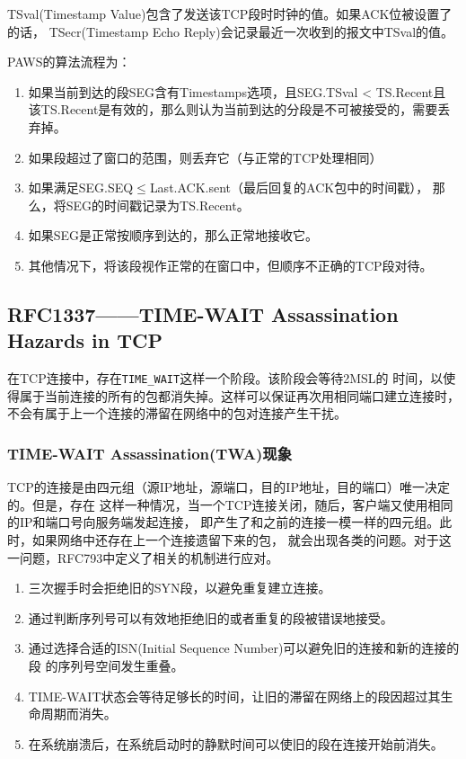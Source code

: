 			TSval(Timestamp Value)包含了发送该TCP段时时钟的值。如果ACK位被设置了的话，
			TSecr(Timestamp Echo Reply)会记录最近一次收到的报文中TSval的值。

PAWS的算法流程为：
\begin{enumerate}
  \item 如果当前到达的段SEG含有Timestamps选项，且SEG.TSval < TS.Recent且
该TS.Recent是有效的，那么则认为当前到达的分段是不可被接受的，需要丢弃掉。
  \item 如果段超过了窗口的范围，则丢弃它（与正常的TCP处理相同）
  \item 如果满足SEG.SEQ$\leqslant$Last.ACK.sent（最后回复的ACK包中的时间戳），
    那么，将SEG的时间戳记录为TS.Recent。
  \item 如果SEG是正常按顺序到达的，那么正常地接收它。
  \item 其他情况下，将该段视作正常的在窗口中，但顺序不正确的TCP段对待。
\end{enumerate}

\subsection{RFC1337——TIME-WAIT Assassination Hazards in TCP}
\label{subsec:rfc1337}
在TCP连接中，存在\texttt{TIME_WAIT}这样一个阶段。该阶段会等待2MSL的
时间，以使得属于当前连接的所有的包都消失掉。这样可以保证再次用相同端口建立连接时，
不会有属于上一个连接的滞留在网络中的包对连接产生干扰。

\subsubsection{TIME-WAIT Assassination(TWA)现象}
\label{subsec:time_wait_assassination}
TCP的连接是由四元组（源IP地址，源端口，目的IP地址，目的端口）唯一决定的。但是，存在
这样一种情况，当一个TCP连接关闭，随后，客户端又使用相同的IP和端口号向服务端发起连接，
即产生了和之前的连接一模一样的四元组。此时，如果网络中还存在上一个连接遗留下来的包，
就会出现各类的问题。对于这一问题，RFC793中定义了相关的机制进行应对。

\begin{enumerate}
\item 三次握手时会拒绝旧的SYN段，以避免重复建立连接。
\item 通过判断序列号可以有效地拒绝旧的或者重复的段被错误地接受。
\item 通过选择合适的ISN(Initial Sequence Number)可以避免旧的连接和新的连接的段
的序列号空间发生重叠。
\item TIME-WAIT状态会等待足够长的时间，让旧的滞留在网络上的段因超过其生命周期而消失。
\item 在系统崩溃后，在系统启动时的静默时间可以使旧的段在连接开始前消失。
\end{enumerate}

